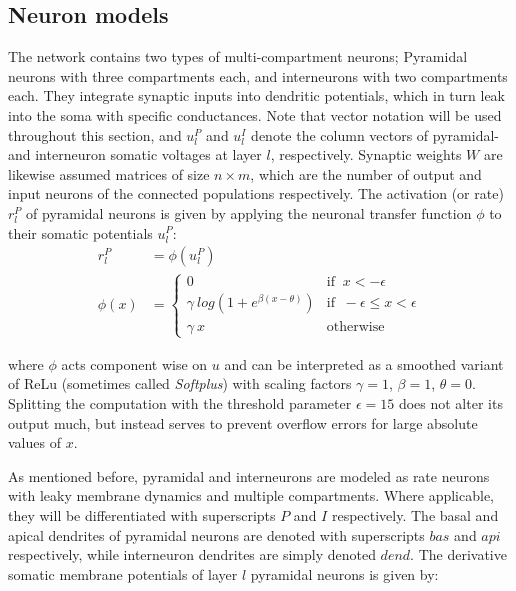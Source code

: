 \subsection{Neuron models}\label{sec-neurons}



The network contains two types of multi-compartment neurons; Pyramidal neurons with three compartments each, and
interneurons with two compartments each. They integrate synaptic inputs into dendritic potentials, which in turn leak
into the soma with specific conductances. Note that vector notation will be used throughout this section, and $u_l^P$
and $u_l^I$ denote the column vectors of pyramidal- and interneuron somatic voltages at layer $l$, respectively.
Synaptic weights $W$ are likewise assumed matrices of size $n \times m$, which are the number of output and input
neurons of the connected populations respectively. The activation (or rate) $r_l^P$ of pyramidal neurons is given by
applying the neuronal transfer function $\phi$ to their somatic potentials $u_l^P$:
\begin{align}
  r_l^P   & = \phi(u_l^P)                                                                      \\
  \phi(x) & = \begin{cases}
                0                                   & \textrm{if } \ x < -\epsilon               \\
                \gamma \ log(1+e^{\beta(x-\theta)}) & \textrm{if } \ -\epsilon \leq x < \epsilon \\
                \gamma \ x                          & \textrm{otherwise}
              \end{cases}
\end{align}

where $\phi$ acts component wise on $u$ and can be interpreted as a smoothed variant of ReLu (sometimes called
\textit{Softplus}) with scaling factors $\gamma=1$, $\beta=1$, $\theta=0$. Splitting the computation with the threshold
parameter $\epsilon=15$ does not alter its output much, but instead serves to prevent overflow errors for large absolute
values of $x$.

As mentioned before, pyramidal and interneurons are modeled as rate neurons with leaky membrane dynamics and multiple
compartments. Where applicable, they will be differentiated with superscripts $P$ and $I$ respectively. The basal and
apical dendrites of pyramidal neurons are denoted with superscripts $bas$ and $api$ respectively, while interneuron
dendrites are simply denoted $dend$.  The derivative somatic membrane potentials of layer $l$ pyramidal neurons is given
by:


